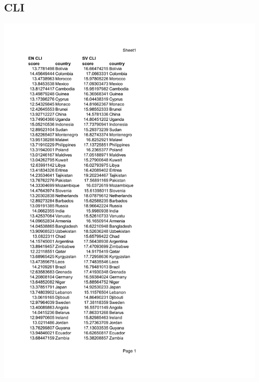 \documentclass[a4paper]{article}
\begin{document}
\subsection{CLI}
\includegraphics[page=1,scale=0.75]{CLI.pdf}
\end{document}
